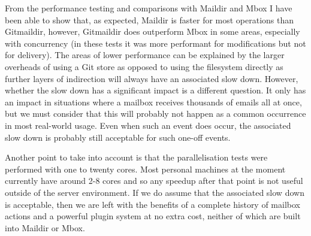 From the performance testing and comparisons with Maildir and Mbox I have been able to show that, as expected, Maildir is faster for most operations than Gitmaildir, however, Gitmaildir does outperform Mbox in some areas, especially with concurrency (in these tests it was more performant for modifications but not for delivery). The areas of lower performance can be explained by the larger overheads of using a Git store as opposed to using the filesystem directly as further layers of indirection will always have an associated slow down. However, whether the slow down has a significant impact is a different question. It only has an impact in situations where a mailbox receives thousands of emails all at once, but we must consider that this will probably not happen as a common occurrence in most real-world usage. Even when such an event does occur, the associated slow down is probably still acceptable for such one-off events.

Another point to take into account is that the parallelisation tests were performed with one to twenty cores. Most personal machines at the moment currently have around 2-8 cores and so any speedup after that point is not useful outside of the server environment. If we do assume that the associated slow down is acceptable, then we are left with the benefits of a complete history of mailbox actions and a powerful plugin system at no extra cost, neither of which are built into Maildir or Mbox.

